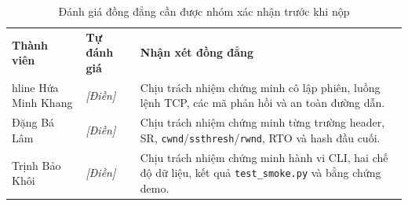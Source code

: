 \begin{table}[H]
\centering\small
\begin{tabular}{|p{3cm}|p{2cm}|p{8cm}|}\hline
\textbf{Thành viên}&\textbf{Tự đánh giá}&\textbf{Nhận xét đồng đẳng}\
\\hline
Hứa Minh Khang&\textit{[Điền]}&Chịu trách nhiệm chứng minh cô lập phiên, luồng lệnh TCP, các mã phản hồi và an toàn đường dẫn.\\\hline
Đặng Bá Lâm&\textit{[Điền]}&Chịu trách nhiệm chứng minh từng trường header, SR, \texttt{cwnd}/\texttt{ssthresh}/\texttt{rwnd}, RTO và hash đầu cuối.\\\hline
Trịnh Bảo Khôi&\textit{[Điền]}&Chịu trách nhiệm chứng minh hành vi CLI, hai chế độ dữ liệu, kết quả \texttt{test\_smoke.py} và bằng chứng demo.\\\hline
\end{tabular}
\caption{Đánh giá đồng đẳng cần được nhóm xác nhận trước khi nộp}
\end{table}